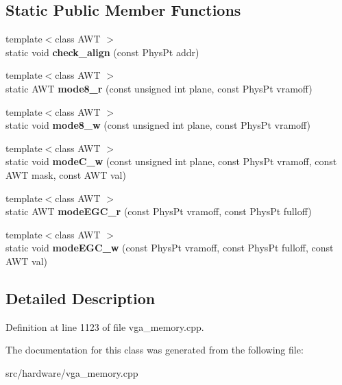 \subsection*{Static Public Member Functions}
\begin{DoxyCompactItemize}
\item 
\hypertarget{classVGA__PC98__PageHandler_ad0cab17b7f08ec55aea9fa00c6154ef5}{{\footnotesize template$<$class A\-W\-T $>$ }\\static void {\bfseries check\-\_\-align} (const Phys\-Pt addr)}\label{classVGA__PC98__PageHandler_ad0cab17b7f08ec55aea9fa00c6154ef5}

\item 
\hypertarget{classVGA__PC98__PageHandler_a258b7ab8e0bf52a16e15c16ab0811670}{{\footnotesize template$<$class A\-W\-T $>$ }\\static A\-W\-T {\bfseries mode8\-\_\-r} (const unsigned int plane, const Phys\-Pt vramoff)}\label{classVGA__PC98__PageHandler_a258b7ab8e0bf52a16e15c16ab0811670}

\item 
\hypertarget{classVGA__PC98__PageHandler_a64b218e643644a33e0c298622dbe72b9}{{\footnotesize template$<$class A\-W\-T $>$ }\\static void {\bfseries mode8\-\_\-w} (const unsigned int plane, const Phys\-Pt vramoff)}\label{classVGA__PC98__PageHandler_a64b218e643644a33e0c298622dbe72b9}

\item 
\hypertarget{classVGA__PC98__PageHandler_ad50a2f65155811c9398c8c17ccf65fb1}{{\footnotesize template$<$class A\-W\-T $>$ }\\static void {\bfseries mode\-C\-\_\-w} (const unsigned int plane, const Phys\-Pt vramoff, const A\-W\-T mask, const A\-W\-T val)}\label{classVGA__PC98__PageHandler_ad50a2f65155811c9398c8c17ccf65fb1}

\item 
\hypertarget{classVGA__PC98__PageHandler_a12e4eba4a8b70a108fa7623c3333043e}{{\footnotesize template$<$class A\-W\-T $>$ }\\static A\-W\-T {\bfseries mode\-E\-G\-C\-\_\-r} (const Phys\-Pt vramoff, const Phys\-Pt fulloff)}\label{classVGA__PC98__PageHandler_a12e4eba4a8b70a108fa7623c3333043e}

\item 
\hypertarget{classVGA__PC98__PageHandler_aea2664bee908ecf657cb3d114303d867}{{\footnotesize template$<$class A\-W\-T $>$ }\\static void {\bfseries mode\-E\-G\-C\-\_\-w} (const Phys\-Pt vramoff, const Phys\-Pt fulloff, const A\-W\-T val)}\label{classVGA__PC98__PageHandler_aea2664bee908ecf657cb3d114303d867}

\end{DoxyCompactItemize}


\subsection{Detailed Description}


Definition at line 1123 of file vga\-\_\-memory.\-cpp.



The documentation for this class was generated from the following file\-:\begin{DoxyCompactItemize}
\item 
src/hardware/vga\-\_\-memory.\-cpp\end{DoxyCompactItemize}
